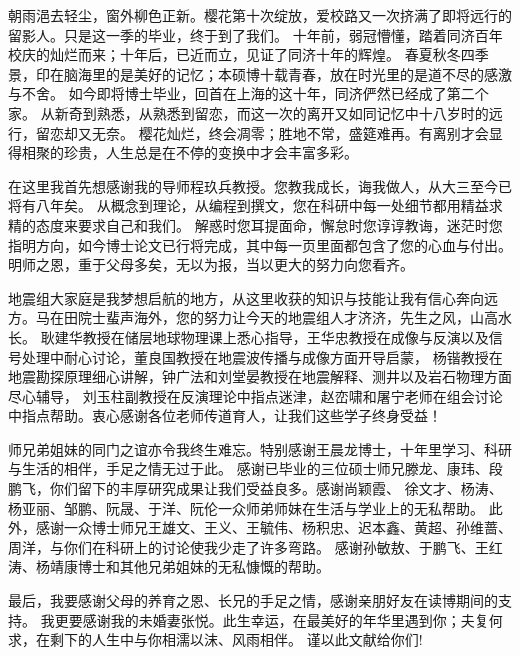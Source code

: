 

\begin{ack}
	朝雨浥去轻尘，窗外柳色正新。樱花第十次绽放，爱校路又一次挤满了即将远行的留影人。只是这一季的毕业，终于到了我们。
	十年前，弱冠懵懂，踏着同济百年校庆的灿烂而来；十年后，已近而立，见证了同济十年的辉煌。
	春夏秋冬四季景，印在脑海里的是美好的记忆；本硕博十载青春，放在时光里的是道不尽的感激与不舍。
	如今即将博士毕业，回首在上海的这十年，同济俨然已经成了第二个家。
	从新奇到熟悉，从熟悉到留恋，而这一次的离开又如同记忆中十八岁时的远行，留恋却又无奈。
	樱花灿烂，终会凋零；胜地不常，盛筵难再。有离别才会显得相聚的珍贵，人生总是在不停的变换中才会丰富多彩。

	在这里我首先想感谢我的导师程玖兵教授。您教我成长，诲我做人，从大三至今已将有八年矣。
	从概念到理论，从编程到撰文，您在科研中每一处细节都用精益求精的态度来要求自己和我们。
	解惑时您耳提面命，懈怠时您谆谆教诲，迷茫时您指明方向，如今博士论文已行将完成，其中每一页里面都包含了您的心血与付出。
	明师之恩，重于父母多矣，无以为报，当以更大的努力向您看齐。

	地震组大家庭是我梦想启航的地方，从这里收获的知识与技能让我有信心奔向远方。马在田院士蜚声海外，您的努力让今天的地震组人才济济，先生之风，山高水长。
	耿建华教授在储层地球物理课上悉心指导，王华忠教授在成像与反演以及信号处理中耐心讨论，董良国教授在地震波传播与成像方面开导启蒙，
	杨锴教授在地震勘探原理细心讲解，钟广法和刘堂晏教授在地震解释、测井以及岩石物理方面尽心辅导，
	刘玉柱副教授在反演理论中指点迷津，赵峦啸和屠宁老师在组会讨论中指点帮助。衷心感谢各位老师传道育人，让我们这些学子终身受益！

	师兄弟姐妹的同门之谊亦令我终生难忘。特别感谢王晨龙博士，十年里学习、科研与生活的相伴，手足之情无过于此。
	感谢已毕业的三位硕士师兄滕龙、康玮、段鹏飞，你们留下的丰厚研究成果让我们受益良多。感谢尚颖霞、
	徐文才、杨涛、杨亚丽、邹鹏、阮晟、于洋、阮伦一众师弟师妹在生活与学业上的无私帮助。
	此外，感谢一众博士师兄王雄文、王义、王毓伟、杨积忠、迟本鑫、黄超、孙维蔷、周洋，与你们在科研上的讨论使我少走了许多弯路。
	感谢孙敏敖、于鹏飞、王红涛、杨靖康博士和其他兄弟姐妹的无私慷慨的帮助。

	最后，我要感谢父母的养育之恩、长兄的手足之情，感谢亲朋好友在读博期间的支持。
	我更要感谢我的未婚妻张悦。此生幸运，在最美好的年华里遇到你；夫复何求，在剩下的人生中与你相濡以沫、风雨相伴。
	谨以此文献给你们!
	



\end{ack}

